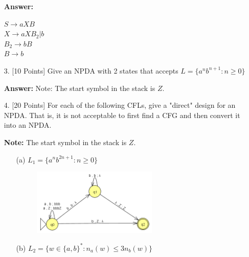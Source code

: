 \documentclass[12pt]{article}
\begin{document}
\begin{spacing}{1.5}
\begin{enumerate}
                  \textbf{Answer:}

                  $S \rightarrow aXB$ \\
                  $X \rightarrow aXB_2 | b$ \\
                  $B_2 \rightarrow bB$ \\
                  $B \rightarrow b$

            \item[3.] [10 Points] Give an NPDA with 2 states that accepts $L=\{a^nb^{n+1} : n \geq 0\}$

                  \textbf{Answer:} Note: The start symbol in the stack is $Z$.


                  \newpage
            \item[4.] [20 Points] For each of the following CFLs, give a "direct" design for an NPDA. That is, it is not acceptable to first find a CFG and then convert it into an NPDA.

                  \textbf{Note:} The start symbol in the stack is $Z$.

                  \begin{enumerate}
                        \item[(a)] $L_1=\{a^nb^{2n+1} : n \geq 0 \}$

                              \begin{figure}[h!]
                                    \centering
                                    \includegraphics[width=0.6\textwidth]{img/q4/q4a.png}
                              \end{figure}

                        \item[(b)] $L_2=\{w \in \{a,b \}^* : n_a(w) \leq 3n_b(w) \}$



\end{enumerate}
\end{enumerate}
\end{spacing}
\end{document}
